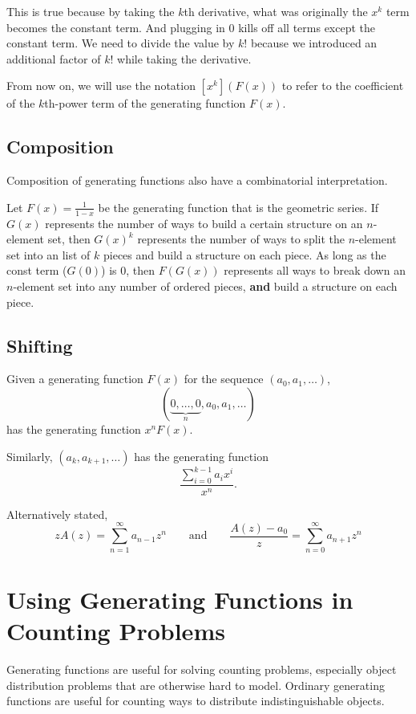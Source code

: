 This is true because by taking the $k$th derivative, what was originally the $x^k$ term becomes the constant term. And plugging in 0 kills off all terms except the constant term. We need to divide the value by $k!$ because we introduced an additional factor of $k!$ while taking the derivative.

From now on, we will use the notation $[x^k](F(x))$ to refer to the coefficient of the $k$th-power term of the generating function $F(x)$.

\subsection{Composition}

Composition of generating functions also have a combinatorial interpretation.

Let $F(x) = \frac{1}{1-x}$ be the generating function that is the geometric series. If $G(x)$ represents the number of ways to build a certain structure on an $n$-element set, then $G(x)^k$ represents the number of ways to split the $n$-element set into an list of $k$ pieces and build a structure on each piece. As long as the const term ($G(0)$) is 0, then $F(G(x))$ represents all ways to break down an $n$-element set into any number of ordered pieces, \textbf{and} build a structure on each piece.

\subsection{Shifting}

Given a generating function $F(x)$ for the sequence $(a_0,a_1,\ldots)$,
$$
(\underbrace{0,\ldots,0}_{n}, a_0, a_1, \ldots)
$$
has the generating function $x^n F(x)$.

Similarly, $(a_k, a_{k+1},\ldots)$ 
has the generating function
$$
\frac{\sum_{i=0}^{k-1} a_i x^i}{x^n}.
$$

Alternatively stated,
$$
zA(z)=\sum_{n = 1}^\infty a_{n-1}z^n \qquad \text{and} \qquad \frac{A(z)-a_0}{z}=\sum_{n=0}^\infty a_{n+1}z^n
$$

\section{Using Generating Functions in Counting Problems}

Generating functions are useful for solving counting problems, especially object distribution problems that are otherwise hard to model. Ordinary generating functions are useful for counting ways to distribute indistinguishable objects.

